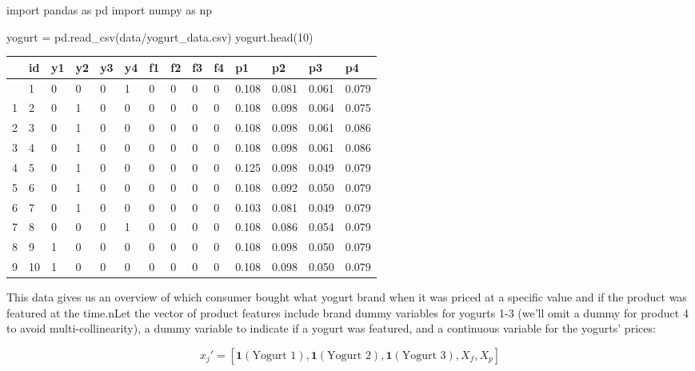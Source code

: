 \documentclass[
  letterpaper,
  DIV=11,
  numbers=noendperiod]{scrartcl}
\newenvironment{Shaded}{\begin{snugshade}}{\end{snugshade}}
\newcommand{\DecValTok}[1]{\textcolor[rgb]{0.68,0.00,0.00}{#1}}
\newcommand{\ImportTok}[1]{\textcolor[rgb]{0.00,0.46,0.62}{#1}}
\newcommand{\NormalTok}[1]{\textcolor[rgb]{0.00,0.23,0.31}{#1}}
\newcommand{\OperatorTok}[1]{\textcolor[rgb]{0.37,0.37,0.37}{#1}}
\newcommand{\StringTok}[1]{\textcolor[rgb]{0.13,0.47,0.30}{#1}}
\begin{document}
\begin{Shaded}
\begin{Highlighting}[]
\ImportTok{import}\NormalTok{ pandas }\ImportTok{as}\NormalTok{ pd }
\ImportTok{import}\NormalTok{ numpy }\ImportTok{as}\NormalTok{ np }

\NormalTok{yogurt }\OperatorTok{=}\NormalTok{ pd.read\_csv(}\StringTok{\textquotesingle{}data/yogurt\_data.csv\textquotesingle{}}\NormalTok{)}
\NormalTok{yogurt.head(}\DecValTok{10}\NormalTok{)}
\end{Highlighting}
\end{Shaded}

\begin{longtable}[]{@{}llllllllllllll@{}}
\toprule\noalign{}
& id & y1 & y2 & y3 & y4 & f1 & f2 & f3 & f4 & p1 & p2 & p3 & p4 \\
\midrule\noalign{}
\endhead
\bottomrule\noalign{}
\endlastfoot
0 & 1 & 0 & 0 & 0 & 1 & 0 & 0 & 0 & 0 & 0.108 & 0.081 & 0.061 & 0.079 \\
1 & 2 & 0 & 1 & 0 & 0 & 0 & 0 & 0 & 0 & 0.108 & 0.098 & 0.064 & 0.075 \\
2 & 3 & 0 & 1 & 0 & 0 & 0 & 0 & 0 & 0 & 0.108 & 0.098 & 0.061 & 0.086 \\
3 & 4 & 0 & 1 & 0 & 0 & 0 & 0 & 0 & 0 & 0.108 & 0.098 & 0.061 & 0.086 \\
4 & 5 & 0 & 1 & 0 & 0 & 0 & 0 & 0 & 0 & 0.125 & 0.098 & 0.049 & 0.079 \\
5 & 6 & 0 & 1 & 0 & 0 & 0 & 0 & 0 & 0 & 0.108 & 0.092 & 0.050 & 0.079 \\
6 & 7 & 0 & 1 & 0 & 0 & 0 & 0 & 0 & 0 & 0.103 & 0.081 & 0.049 & 0.079 \\
7 & 8 & 0 & 0 & 0 & 1 & 0 & 0 & 0 & 0 & 0.108 & 0.086 & 0.054 & 0.079 \\
8 & 9 & 1 & 0 & 0 & 0 & 0 & 0 & 0 & 0 & 0.108 & 0.098 & 0.050 & 0.079 \\
9 & 10 & 1 & 0 & 0 & 0 & 0 & 0 & 0 & 0 & 0.108 & 0.098 & 0.050 &
0.079 \\
\end{longtable}

This data gives us an overview of which consumer bought what yogurt
brand when it was priced at a specific value and if the product was
featured at the time.nLet the vector of product features include brand
dummy variables for yogurts 1-3 (we'll omit a dummy for product 4 to
avoid multi-collinearity), a dummy variable to indicate if a yogurt was
featured, and a continuous variable for the yogurts' prices:

\[ x_j' = [\mathbf{1}(\text{Yogurt 1}), \mathbf{1}(\text{Yogurt 2}), \mathbf{1}(\text{Yogurt 3}), X_f, X_p] \]
\end{document}
